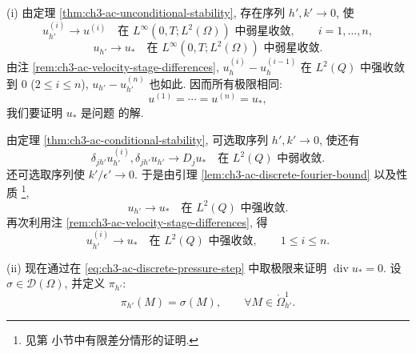 \begin{Proof}
(i) 由定理 \ref{thm:ch3-ac-unconditional-stability}, 存在序列 $h',k'\to0$, 使
\begin{equation}
u_{h'}^{(i)}\longrightarrow u^{(i)}
\quad\text{在 }L^\infty(0,T;L^2(\Omega))\text{ 中弱星收敛},
\qquad i=1,\ldots,n,
\label{eq:ch3-ac-discrete-subsequence-stages}
\end{equation}
\begin{equation}
u_{h'}\longrightarrow u_*
\quad\text{在 }L^\infty(0,T;L^2(\Omega))\text{ 中弱星收敛}.
\label{eq:ch3-ac-discrete-subsequence-interpolant}
\end{equation}
由注 \ref{rem:ch3-ac-velocity-stage-differences}, $u_h^{(i)}-u_h^{(i-1)}$ 在 $L^2(Q)$ 中强收敛到 $0$ ($2\leq i\leq n$), $u_{h'}-u_{h'}^{(n)}$ 也如此. 因而所有极限相同:
\begin{equation}
u^{(1)}=\cdots=u^{(n)}=u_*,
\label{eq:ch3-ac-discrete-common-limit}
\end{equation}
我们要证明 $u_*$ 是问题  的解.

由定理 \ref{thm:ch3-ac-conditional-stability}, 可选取序列 $h',k'\to0$, 使还有
\begin{equation}
\delta_{jh'}u_{h'}^{(i)},\delta_{jh'}u_{h'}
\longrightarrow D_j u_*
\quad\text{在 }L^2(Q)\text{ 中弱收敛}.
\label{eq:ch3-ac-discrete-weak-derivative-limit}
\end{equation}
还可选取序列使 $k'/\epsilon'\to0$. 于是由引理 \ref{lem:ch3-ac-discrete-fourier-bound} 以及性质 \footnote{见第  小节中有限差分情形的证明.},
\begin{equation}
u_{h'}\longrightarrow u_*
\quad\text{在 }L^2(Q)\text{ 中强收敛}.
\label{eq:ch3-ac-discrete-strong-interpolant}
\end{equation}
再次利用注 \ref{rem:ch3-ac-velocity-stage-differences}, 得
\begin{equation}
u_{h'}^{(i)}\longrightarrow u_*
\quad\text{在 }L^2(Q)\text{ 中强收敛},
\qquad1\leq i\leq n.
\label{eq:ch3-ac-discrete-strong-stages}
\end{equation}

(ii) 现在通过在 \eqref{eq:ch3-ac-discrete-pressure-step} 中取极限来证明 $\operatorname{div}u_*=0$. 设 $\sigma\in\mathcal D(\Omega)$, 并定义 $\pi_{h'}$:
\[
\pi_{h'}(M)=\sigma(M),
\qquad\forall M\in\mathring\Omega_{h'}^1.
\]


\end{Proof}
